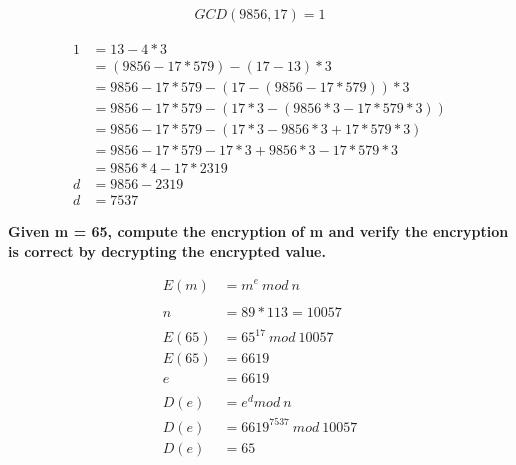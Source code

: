 \documentclass[letterpaper]{article}
\begin{document}
\begin{equation*}
  \begin{split}
GCD(9856, 17) = 1
  \end{split}
\end{equation*}

\begin{equation*}
  \begin{split}
1	&= 13 - 4*3 \\
&= (9856 - 17*579) - (17 - 13)*3 \\
&= 9856 - 17*579 - (17 - (9856 - 17*579))*3 \\
&= 9856 - 17*579 - (17*3 - (9856*3 - 17*579*3)) \\
&= 9856 - 17*579 - (17*3 - 9856*3 + 17*579*3) \\
&= 9856 - 17*579 - 17*3 + 9856*3 - 17*579*3 \\
&= 9856*4 - 17*2319 \\
d &= 9856 - 2319 \\
d &= 7537
  \end{split}
\end{equation*}

\textbf{Given m = 65, compute the encryption of m and verify the encryption is correct by decrypting the encrypted value.}

\begin{equation*}
  \begin{split}
E(m) &= m^e\ mod\ n \\
\\
n &= 89 * 113 = 10057 \\
\\
E(65) &= 65^17\ mod\ 10057 \\
E(65) &= 6619 \\
e &= 6619 \\
\\
D(e) &= e^d mod\ n \\
D(e) &= 6619^7537\ mod\ 10057 \\
D(e) &= 65
  \end{split}
\end{equation*}
\end{document}
